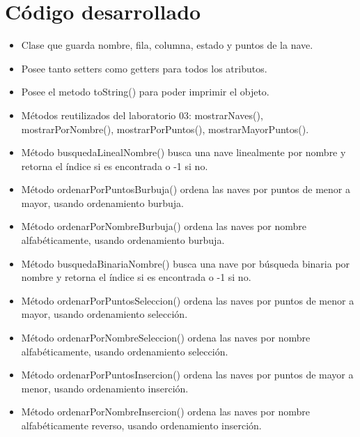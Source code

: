 \documentclass{article}
\begin{document}
\section{Código desarrollado}

\begin{itemize}
	\item Clase que guarda nombre, fila, columna, estado y puntos de la nave.
	\item Posee tanto setters como getters para todos los atributos.
	\item Posee el metodo toString() para poder imprimir el objeto.
\end{itemize}
\pagebreak

\begin{itemize}
	\item Métodos reutilizados del laboratorio 03: mostrarNaves(), mostrarPorNombre(), mostrarPorPuntos(), mostrarMayorPuntos().
	\item Método busquedaLinealNombre() busca una nave linealmente por nombre y retorna el índice si es encontrada o -1 si no.
	\item Método ordenarPorPuntosBurbuja() ordena las naves por puntos de menor a mayor, usando ordenamiento burbuja.
	\item Método ordenarPorNombreBurbuja() ordena las naves por nombre alfabéticamente, usando ordenamiento burbuja.
	\item Método busquedaBinariaNombre() busca una nave por búsqueda binaria por nombre y retorna el índice si es encontrada o -1 si no.
	\item Método ordenarPorPuntosSeleccion() ordena las naves por puntos de menor a mayor, usando ordenamiento selección.
	\item Método ordenarPorNombreSeleccion() ordena las naves por nombre alfabéticamente, usando ordenamiento selección.
	\item Método ordenarPorPuntosInsercion() ordena las naves por puntos de mayor a menor, usando ordenamiento inserción.
	\item Método ordenarPorNombreInsercion() ordena las naves por nombre alfabéticamente reverso, usando ordenamiento inserción.
\end{itemize}
\pagebreak
\end{document}
